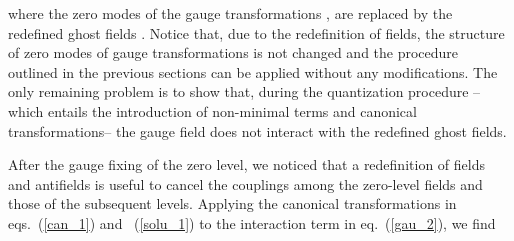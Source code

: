 \documentclass[a4paper,12pt]{article}
\begin{document}
where the zero modes of the gauge transformations \coordHE{}, are
replaced by the redefined ghost fields \coordHE{}.
Notice that, due to the redefinition of fields, the structure of zero
modes of gauge transformations is not changed and the procedure
outlined in the previous sections can be applied without any
modifications.  The only remaining problem is to show that, during the
quantization procedure --which entails the introduction of non-minimal
terms and canonical transformations-- the gauge field \coordHE{} does not
interact with the redefined ghost fields.

After the gauge fixing of the zero level, we noticed that a
redefinition of fields and antifields is useful to cancel the
couplings among the zero-level fields and those of the subsequent
levels.  Applying the canonical transformations in eqs.~(\ref{can_1})
and ~(\ref{solu_1}) to the interaction term in eq.~(\ref{gau_2}), we
find
\end{document}
